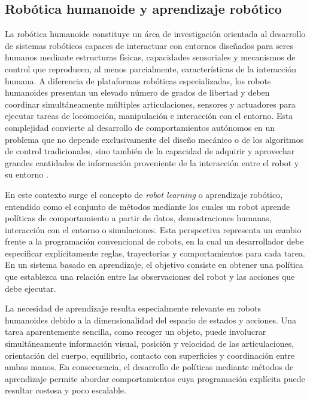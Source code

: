 \documentclass[stu,12pt,floatsintext]{apa7}
\begin{document}
\clearpage

\subsection{Robótica humanoide y aprendizaje robótico}

La robótica humanoide constituye un área de investigación orientada al desarrollo de sistemas robóticos capaces de interactuar con entornos diseñados para seres humanos mediante estructuras físicas, capacidades sensoriales y mecanismos de control que reproducen, al menos parcialmente, características de la interacción humana. A diferencia de plataformas robóticas especializadas, los robots humanoides presentan un elevado número de grados de libertad y deben coordinar simultáneamente múltiples articulaciones, sensores y actuadores para ejecutar tareas de locomoción, manipulación e interacción con el entorno. Esta complejidad convierte al desarrollo de comportamientos autónomos en un problema que no depende exclusivamente del diseño mecánico o de los algoritmos de control tradicionales, sino también de la capacidad de adquirir y aprovechar grandes cantidades de información proveniente de la interacción entre el robot y su entorno \parencite{seo2025learningsimtorealhumanoidlocomotion}.

En este contexto surge el concepto de \textit{robot learning} o aprendizaje robótico, entendido como el conjunto de métodos mediante los cuales un robot aprende políticas de comportamiento a partir de datos, demostraciones humanas, interacción con el entorno o simulaciones. Esta perspectiva representa un cambio frente a la programación convencional de robots, en la cual un desarrollador debe especificar explícitamente reglas, trayectorias y comportamientos para cada tarea. En un sistema basado en aprendizaje, el objetivo consiste en obtener una política que establezca una relación entre las observaciones del robot y las acciones que debe ejecutar.

La necesidad de aprendizaje resulta especialmente relevante en robots humanoides debido a la dimensionalidad del espacio de estados y acciones. Una tarea aparentemente sencilla, como recoger un objeto, puede involucrar simultáneamente información visual, posición y velocidad de las articulaciones, orientación del cuerpo, equilibrio, contacto con superficies y coordinación entre ambas manos. En consecuencia, el desarrollo de políticas mediante métodos de aprendizaje permite abordar comportamientos cuya programación explícita puede resultar costosa y poco escalable.
\end{document}
